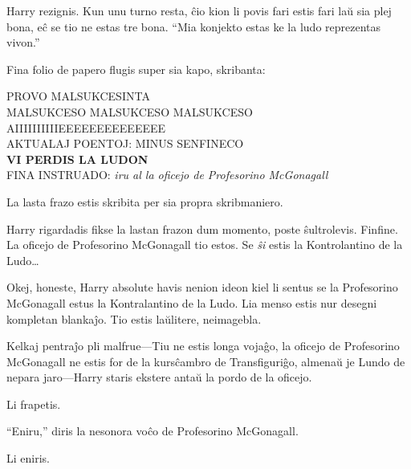 Harry rezignis. Kun unu turno resta, ĉio kion li povis fari estis fari
laŭ sia plej bona, eĉ se tio ne estas tre bona. ``Mia konjekto estas
ke la ludo reprezentas vivon.''

Fina folio de papero flugis super sia kapo, skribanta:
\begin{center}
  PROVO MALSUKCESINTA\\
  MALSUKCESO MALSUKCESO MALSUKCESO\\
  AIIIIIIIIIIEEEEEEEEEEEEEE\\
  AKTUALAJ POENTOJ: MINUS SENFINECO\\
  \textbf{VI PERDIS LA LUDON}\\
  FINA INSTRUADO: \emph{iru al la oficejo de Profesorino McGonagall}
\end{center}

La lasta frazo estis skribita per sia propra skribmaniero.

Harry rigardadis fikse la lastan frazon dum momento, poste
ŝultrolevis. Finfine. La oficejo de Profesorino McGonagall tio
estos. Se \emph{ŝi} estis la Kontrolantino de la Ludo\ldots

Okej, honeste, Harry absolute havis nenion ideon kiel li sentus se la
Profesorino McGonagall estus la Kontralantino de la Ludo. Lia menso
estis nur desegni kompletan blankaĵo. Tio estis laŭlitere, neimagebla.

Kelkaj pentraĵo pli malfrue—Tiu ne estis longa vojaĝo, la oficejo de Profesorino McGonagall ne estis for de la kursĉambro de Transfiguriĝo, almenaŭ je Lundo de nepara jaro—Harry staris ekstere antaŭ la pordo de la oficejo.

Li frapetis.

``Eniru,'' diris la nesonora voĉo de Profesorino McGonagall.

Li eniris.




